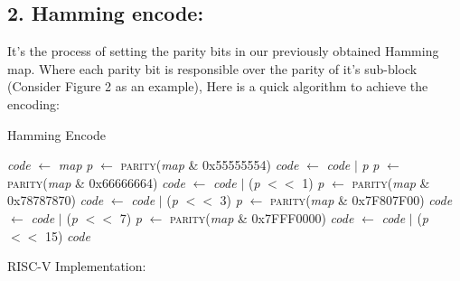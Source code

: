 \documentclass[11pt]{article}
\begin{document}
\subsection*{2. Hamming encode:}
It's the process of setting the parity bits in our previously obtained Hamming map. Where each parity bit is responsible over the parity of it's sub-block (Consider Figure 2 as an example), Here is a quick algorithm to achieve the encoding:
\begin{algorithm}[H]
\caption{Hamming Encode}
\begin{algorithmic}[1]
    \State \textit{code} $\gets$ \textit{map} 
    \State \textit{p} $\gets$ \textsc{parity}(\textit{map} \& 0x55555554)
    \State \textit{code} $\gets$ \textit{code} $|$ \textit{p}
    \State \textit{p} $\gets$ \textsc{parity}(\textit{map} \& 0x66666664)
    \State \textit{code} $\gets$ \textit{code} $|$ (\textit{p} $<<$ 1)
    \State \textit{p} $\gets$ \textsc{parity}(\textit{map} \& 0x78787870)
    \State \textit{code} $\gets$ \textit{code} $|$ (\textit{p} $<<$ 3)
    \State \textit{p} $\gets$ \textsc{parity}(\textit{map} \& 0x7F807F00)
    \State \textit{code} $\gets$ \textit{code} $|$ (\textit{p} $<<$ 7)
    \State \textit{p} $\gets$ \textsc{parity}(\textit{map} \& 0x7FFF0000)
    \State \textit{code} $\gets$ \textit{code} $|$ (\textit{p} $<<$ 15)
    \State \Return \textit{code}
\EndFunction
\end{algorithmic}
\end{algorithm}

RISC-V Implementation:
\end{document}
